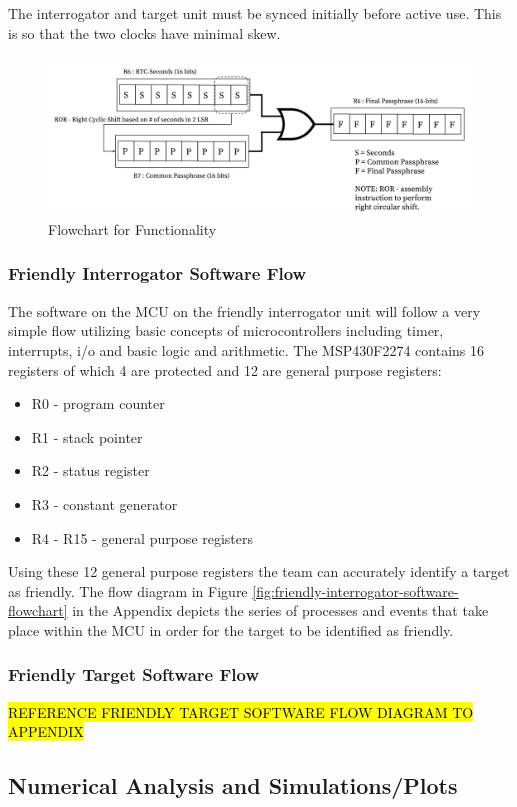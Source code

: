\documentclass[letterpaper,10pt]{article}
\begin{document}
\begin{spacing}{1.15}
The interrogator and target unit must be synced initially before active use. This is so that the two clocks have minimal skew. 
\begin{figure} [H]
	\centering
	\includegraphics[scale=0.45]{Encryption_Diagram.png}
	\caption{Flowchart for Functionality\label{fig:circuit-schematic}}
\end{figure}


\subsubsection{Friendly Interrogator Software Flow}
The software on the MCU on the friendly interrogator unit will follow a very simple flow utilizing basic concepts of microcontrollers including timer, interrupts, i/o and basic logic and arithmetic. The MSP430F2274 contains 16 registers of which 4 are protected and 12 are general purpose registers:
\begin{itemize}
	\item R0 - program counter
	\item R1 - stack pointer 
	\item R2 - status register
	\item R3 - constant generator
	\item R4 - R15 - general purpose registers
\end{itemize}
Using these 12 general purpose registers the team can accurately identify a target as friendly. The flow diagram in Figure \ref*{fig:friendly-interrogator-software-flowchart} in the Appendix depicts the series of processes and events that take place within the MCU in order for the target to be identified as friendly. 

\subsubsection{Friendly Target Software Flow}
\hl{REFERENCE FRIENDLY TARGET SOFTWARE FLOW DIAGRAM TO APPENDIX}
\subsection{Numerical Analysis and Simulations/Plots} \label{section-simulations-calculations}

\end{spacing}
\end{document}
